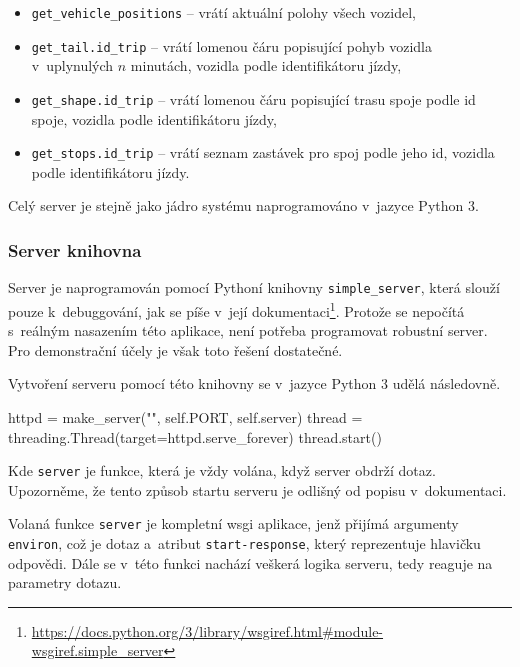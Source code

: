 \begin{itemize}
	\item \verb-get_vehicle_positions- -- vrátí aktuální polohy všech vozidel,


	\item \verb-get_tail.id_trip- -- vrátí lomenou čáru popisující pohyb vozidla v~uplynulých $n$ minutách, vozidla podle identifikátoru jízdy,


	\item \verb-get_shape.id_trip- -- vrátí lomenou čáru popisující trasu spoje podle id spoje, vozidla podle identifikátoru jízdy,


	\item \verb-get_stops.id_trip- -- vrátí seznam zastávek pro spoj podle jeho id, vozidla podle identifikátoru jízdy.
\end{itemize}


Celý server je stejně jako jádro systému naprogramováno v~jazyce Python 3.


\subsubsection{Server knihovna}


Server je naprogramován pomocí Pythoní knihovny \verb-simple_server-, která slouží pouze k~debuggování, jak se píše v~její dokumentaci\footnote{\url{https://docs.python.org/3/library/wsgiref.html\#module-wsgiref.simple_server}}. Protože se nepočítá s~reálným nasazením této aplikace, není potřeba programovat robustní server. Pro demonstrační účely je však toto řešení dostatečné.


\bigbreak


Vytvoření serveru pomocí této knihovny se v~jazyce Python 3 udělá následovně.


\begin{code}[frame=none]
httpd = make_server("", self.PORT, self.server)
thread = threading.Thread(target=httpd.serve_forever)
thread.start()
\end{code}


Kde \verb-server- je funkce, která je vždy volána, když server obdrží dotaz. Upozorněme, že tento způsob startu serveru je odlišný od popisu v~dokumentaci.


\bigbreak


Volaná funkce \verb-server- je kompletní \gls{wsgi} aplikace, jenž přijímá argumenty \verb-environ-, což je dotaz a~atribut \verb:start-response:, který reprezentuje hlavičku odpovědi. Dále se v~této funkci nachází veškerá logika serveru, tedy reaguje na parametry dotazu.


